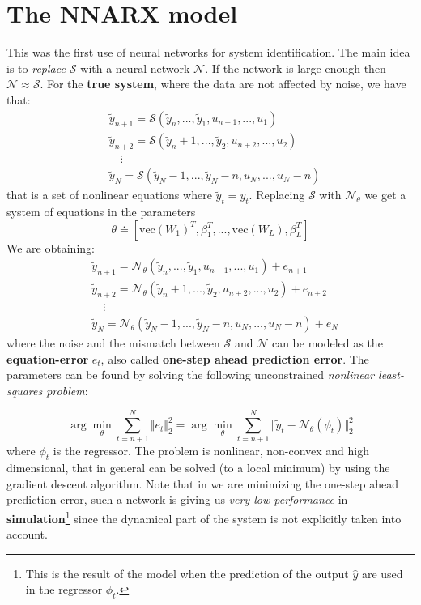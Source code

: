 \section{The NNARX model}
This was the first use of neural networks for system identification. The main idea is to \textit{replace $\mathcal{S}$} with a neural network $\mathcal{N}$. If the network is large enough then $\mathcal{N}\approx{\mathcal{S}}$. For the \textbf{true system}, where the data are not affected by noise, we have that:
\begin{align*}
    &\tilde{y}_{n+1}=\mathcal{S}(\tilde{y}_n,...,\tilde{y}_1,u_{n+1},...,u_1)\\
    &\tilde{y}_{n+2}=\mathcal{S}(\tilde{y}_n+1,...,\tilde{y}_2,u_{n+2},...,u_2)\\
    &  \quad  \vdots\\
    & \tilde{y}_{N}=\mathcal{S}(\tilde{y}_N-1,...,\tilde{y}_N-n,u_{N},...,u_N-n)
\end{align*}
that is a set of nonlinear equations where $\tilde{y}_t=y_t$. Replacing $\mathcal{S}$ with $\mathcal{N}_\theta$ we get a system of equations in the parameters 
\begin{equation}
    \theta\doteq[
        \text{vec}(W_1)^T, \beta_1^T,...,\text{vec}(W_L),\beta_L^T
    ]
\end{equation}
We are obtaining: 
\begin{align*}
    &\tilde{y}_{n+1}=\mathcal{N}_\theta(\tilde{y}_n,...,\tilde{y}_1,u_{n+1},...,u_1)+e_{n+1}\\
    &\tilde{y}_{n+2}=\mathcal{N}_\theta(\tilde{y}_n+1,...,\tilde{y}_2,u_{n+2},...,u_2)+e_{n+2}\\
    &  \quad  \vdots\\
    & \tilde{y}_{N}=\mathcal{N}_\theta(\tilde{y}_N-1,...,\tilde{y}_N-n,u_{N},...,u_N-n)+e_{N}
\end{align*}
where the noise and the mismatch between $\mathcal{S}$ and $\mathcal{N}$ can be modeled as the \textbf{equation-error} $e_t$, also called \textbf{one-step ahead prediction error}. The parameters can be found by solving the following unconstrained \textit{nonlinear least-squares problem}:

\begin{equation} \label{eq:NARX_opt}
    \arg\min_\theta \sum_{t=n+1}^N \Vert e_t \Vert_2^2 = 
    \arg \min_\theta \sum_{t=n+1}^N \Vert \tilde{y}_t - \mathcal{N}_\theta(\phi_t) \Vert_2^2
\end{equation}
where $\phi_t$ is the regressor. The problem is nonlinear, non-convex and high dimensional, that in general can be solved (to a local minimum) by using the gradient descent algorithm. Note that in  we are minimizing the one-step ahead prediction error, such a network is giving us \textit{very low performance} in \textbf{simulation}\footnote{
    This is the result of the model when the prediction of the output $\hat{y}$ are used in the regressor $\phi_t$. 
} since the dynamical part of the system is not explicitly taken into account.

